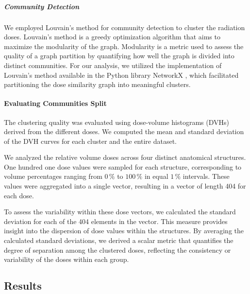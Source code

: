 \subparagraph{Community Detection}
\label{clustering_evaluation}
We employed Louvain's method for community detection to cluster the radiation doses.
Louvain's method is a greedy optimization algorithm that aims to maximize the modularity of the graph.
Modularity is a metric used to assess the quality of a graph partition by quantifying how well the graph is divided into distinct communities.
For our analysis, we utilized the implementation of Louvain's method available in the Python library NetworkX \cite{NetworkX}, which facilitated partitioning the dose similarity graph into meaningful clusters.

\paragraph{Evaluating Communities Split}
The clustering quality was evaluated using dose-volume histograms (DVHs) derived from the different doses.
We computed the mean and standard deviation of the DVH curves for each cluster and the entire dataset.

We analyzed the relative volume doses across four distinct anatomical structures.
One hundred one dose values were sampled for each structure, corresponding to volume percentages ranging from $0\,\%$ to $100\,\%$ in equal $1\,\%$ intervals.
These values were aggregated into a single vector, resulting in a vector of length 404 for each dose.

To assess the variability within these dose vectors, we calculated the standard deviation for each of the 404 elements in the vector.
This measure provides insight into the dispersion of dose values within the structures.
By averaging the calculated standard deviations, we derived a scalar metric that quantifies the degree of separation among the clustered doses, reflecting the consistency or variability of the doses within each group.

\subsection{Results}
